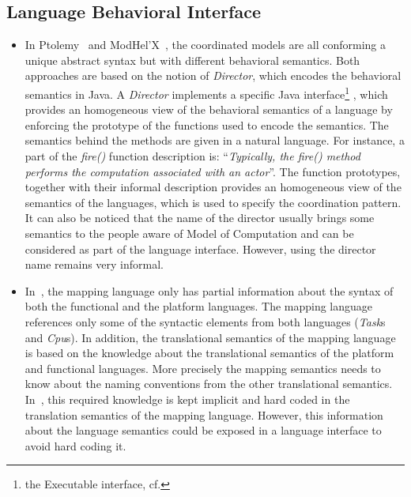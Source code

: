 \subsection{Language Behavioral Interface}
		\begin{itemize}
		
			
			\item In Ptolemy~\cite{ptolemybib} and ModHel'X~\cite{modhelxbib}, the coordinated models are all conforming a unique abstract syntax but with different behavioral semantics. Both approaches are based on the notion of \emph{Director}, which encodes the behavioral semantics in Java. A \emph{Director} implements a specific Java interface\footnote{the Executable interface, cf.} %
			, which provides an homogeneous view of the behavioral semantics of a language by enforcing the prototype of the functions used to encode the semantics. The semantics behind the methods are given in a natural language. For instance, a part of the \emph{fire()} function description is: ``\emph{Typically, the fire() method performs the computation associated with an actor}''. The function prototypes, together with their informal description provides an homogeneous view of the semantics of the languages, which is used to specify the coordination pattern. It can also be noticed that the name of the director usually brings some semantics to the people aware of Model of Computation and can be considered as part of the language interface. However, using the director name remains very informal.
			
			\item In~\cite{dinatale}, the mapping language only has partial information about the syntax of both the functional and the platform languages. The mapping language references only some of the syntactic elements from both languages (\eg \emph{Task}s and \emph{Cpu}s). In addition, the translational semantics of the mapping language is based on the knowledge about the translational semantics of the platform and functional languages. More precisely the mapping semantics needs to know about the naming conventions from the other translational semantics. In~\cite{dinatale}, this required knowledge is kept implicit and hard coded in the translation semantics of the mapping language. However, this information about the language semantics could be exposed in a language interface to avoid hard coding it. 
			

\end{itemize}
